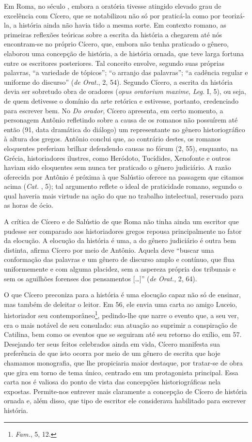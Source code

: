 Em Roma, no século , embora a oratória tivesse atingido elevado grau de
excelência com Cícero, que se notabilizou não só por praticá-la como por
teorizá-la, a história ainda não havia tido a mesma sorte. Em contexto romano,
as primeiras reflexões teóricas sobre a escrita da história a chegarem até nós
encontram-se no próprio Cícero, que, embora não tenha praticado o gênero,
elaborou uma concepção de história, a de história ornada, que teve larga
fortuna entre os escritores posteriores. Tal conceito envolve, segundo suas
próprias palavras, “a variedade de tópicos”; “o arranjo das palavras”; “a
cadência regular e uniforme do discurso” (\emph{de Orat.}, 2, 54). Segundo
Cícero, a escrita da história devia ser sobretudo obra de oradores (\emph{opus
oratorium maxime}, \emph{Leg.} I, 5), ou seja, de quem detivesse o domínio
da arte retórica e estivesse, portanto, credenciado para escrever bem.  No \emph{Do
orador}, Cícero apresenta, em certo momento, a personagem Antônio refletindo
sobre a causa de os romanos não possuírem até então (91, data dramática
do diálogo) um representante no gênero historiográfico à altura dos gregos.
Antônio conclui que, ao contrário destes, os romanos eloquentes preferiam
brilhar defendendo causas no fórum (2, 55), enquanto, na Grécia, historiadores
ilustres, como Heródoto, Tucídides, Xenofonte e outros haviam sido  eloquentes
sem nunca ter praticado o gênero judiciário.  A razão oferecida por Antônio é
próxima à que Salústio oferece na passagem que citamos acima (\emph{Cat.} ,
5);  tal argumento reflete o ideal de praticidade romano, segundo o qual
haveria mais virtude na ação do que no trabalho intelectual, reservado para as
horas de ócio.  

 A crítica de Cícero e de Salústio de que Roma não tinha ainda um escritor que
 pudesse ser comparado aos historiadores gregos repousa principalmente no fator
 da elocução. A elocução da história é uma, a do gênero judiciário é outra bem
 distinta, afirma Cícero por meio de Antônio. Aquela deve ``buscar uma conformação das palavras e um gênero de discurso amplo e contínuo, que flua uniformemente e com alguma placidez, sem a aspereza própria dos tribunais e sem os aguilhões forenses dos pensamentos  [\ldots]” (\emph{de Orat.}, 2, 64). 
 
O que Cícero preconiza para a história é uma elocução capaz não só de ensinar,
mas também de deleitar o leitor. Em 56, ele envia uma carta ao amigo Luceio,
historiador seu contemporâneo\footnote{ \emph{Fam.}, 5, 12.}, pedindo-lhe que
narre o evento que, a seu ver, era o mais notável de seu consulado: sua atuação
ao suprimir a conspiração de Catilina, bem como os eventos que se seguiram até
seu retorno do exílio, em 57. Desejando ter seus feitos celebrados ainda em
vida, Cícero manifesta sua preferência de que isto ocorra por meio de um gênero
de escrita que hoje chamamos monografia, que lhe propiciaria maior destaque,
por tratar-se de obra que gira em torno de tema único, centrado em um
protagonista principal. Essa carta nos é valiosa do ponto de vista das
concepções historiográficas nela expostas. Permite-nos entrever mais claramente
a concepção de Cícero de história ornada e, além disso, que tipo de escritor
ele considerava habilitado para escrever história. 


